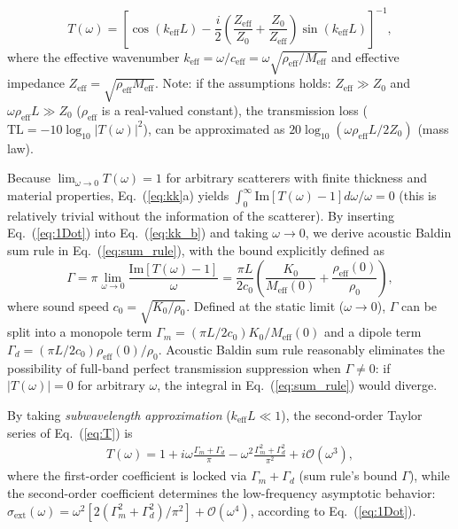 \documentclass[final,5p,times,twocolumn]{elsarticle}
\begin{document}
\begin{equation} \label{eq:T}
	T(\omega) = \left[ \cos \left(k_{\mathrm{eff}} L\right) - \frac{i}{2} \left( \frac{Z_{\mathrm{eff}}}{Z_0} + \frac{Z_0}{Z_{\mathrm{eff}}} \right) \sin \left(k_{\mathrm{eff}} L\right) \right]^{-1},
\end{equation}
where the effective wavenumber $k_{\mathrm{eff}} =\omega/c_{\mathrm{eff}}=\omega\sqrt{\rho_{\mathrm{eff}}/M_{\mathrm{eff}}}$ and effective impedance $Z_{\mathrm{eff}}=\sqrt{\rho_{\mathrm{eff}}M_\mathrm{eff}}$. Note: if the assumptions holds: $Z_\mathrm{eff}\gg Z_0$ and $\omega \rho_{\text{eff}} L\gg Z_0$ ($\rho_{\text{eff}}$ is a real-valued constant), the transmission loss ($\mathrm{TL}=-10 \log _{10}|T(\omega)|^2$), can be approximated as $	 20 \log_{10} \left( \omega \rho_{\text{eff}} L/2 Z_0 \right)$ (mass law).

Because $\lim_{\omega \to 0} T(\omega) = 1$ for arbitrary scatterers with finite thickness and material properties, Eq.~(\ref{eq:kk}a) yields $\int_{0}^{\infty} \mathrm{Im}[T(\omega)-1] d \omega / \omega = 0$ (this is relatively trivial without the information of the scatterer). By inserting Eq.~(\ref{eq:1Dot}) into Eq.~(\ref{eq:kk_b}) and taking $\omega \to 0$, we derive acoustic Baldin sum rule in Eq.~(\ref{eq:sum_rule}), with the bound explicitly defined as
\begin{equation} \label{eq:bound}
	\Gamma = \pi \lim_{\omega \to 0} \frac{\mathrm{Im}[T(\omega) - 1]}{\omega} = \frac{\pi L}{2 c_0} \left(\frac{K_0}{M_{\mathrm{eff}}(0)} + \frac{\rho_{\mathrm{eff}}(0)}{\rho_0}\right) ,
\end{equation}
where sound speed $c_0 = \sqrt{K_0 / \rho_0}$. Defined at the static limit ($\omega \to 0$), $\Gamma$ can be split into a monopole term $\Gamma_m=({\pi L}/{2 c_0})  {K_0}/M_{\mathrm{eff}}(0)$ and a dipole term $\Gamma_d=({\pi L}/{2 c_0}) \rho_{\mathrm{eff}}(0)/{\rho_0} $. Acoustic Baldin sum rule reasonably eliminates the possibility of full-band perfect transmission suppression when $\Gamma\neq0$: if \( |T(\omega)| = 0 \) for arbitrary $\omega$, the integral in Eq.~(\ref{eq:sum_rule}) would diverge.

By taking \textit{subwavelength approximation} ($k_{\mathrm{eff}} L \ll 1$), the second-order Taylor series of Eq.~(\ref{eq:T}) is
\begin{align} \label{eq:T_low}
	T(\omega) = 1+ i\omega\frac{\Gamma_m+\Gamma_d}{\pi} -\omega^2 \frac{\Gamma_m^2+\Gamma_d^2 }{\pi^2} +i\mathcal{O}(\omega^3),
\end{align}
where the first-order coefficient is locked via $ \Gamma_m+\Gamma_d$ (sum rule's bound $\Gamma$), while the second-order coefficient determines the low-frequency asymptotic behavior: $\sigma_\mathrm{ext}(\omega)= \omega^2 [2 (\Gamma_m^2+\Gamma_d^2)/{\pi^2}] +\mathcal{O}(\omega^4)$, according to Eq.~(\ref{eq:1Dot}).
\end{document}

